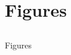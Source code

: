 \documentclass[graphics]{beamer}
\begin{document}
\normalsize




\section{Figures} 
\subsection{} 
\begin{frame}
\begin{center}
\Huge{Figures}
\end{center}
\end{frame}
\end{document}
